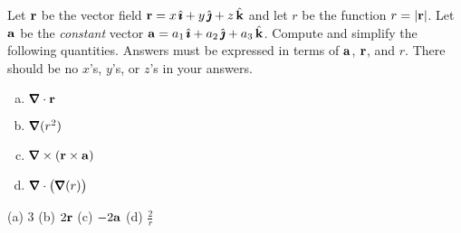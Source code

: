 \begin{question}[M317 2017A] %
Let $\mathbf{r}$ be the vector field $\mathbf{r} = x\,\hat{\pmb{\imath}} + y\,\hat{\pmb{\jmath}} + z\,\hat{\mathbf{k}}$ and let 
$r$ be the function $r = |\mathbf{r}|$. Let $\mathbf{a}$ be the \emph{constant} 
vector $\mathbf{a} = a_1\,\hat{\pmb{\imath}} + a_2\,\hat{\pmb{\jmath}} + a_3\,\hat{\mathbf{k}}$. Compute and simplify 
the following quantities.
Answers must be expressed in terms of $\mathbf{a}$, $\mathbf{r}$, and $r$. There should 
be no $x$'s, $y$'s, or $z$'s in your answers.
\begin{enumerate}[(a)]
\item
$\vnabla\cdot\vr$

\item
$\vnabla(r^2)$

\item
$\vnabla\times(\vr\times\va)$

\item
$\vnabla\cdot\big(\vnabla(r)\big)$

\end{enumerate}
\end{question}


\begin{answer} 
(a) $3$\qquad
(b) $2\mathbf{r}$\qquad
(c) $-2\mathbf{a}$\qquad
(d) $\frac{2}{r}$
\end{answer}

